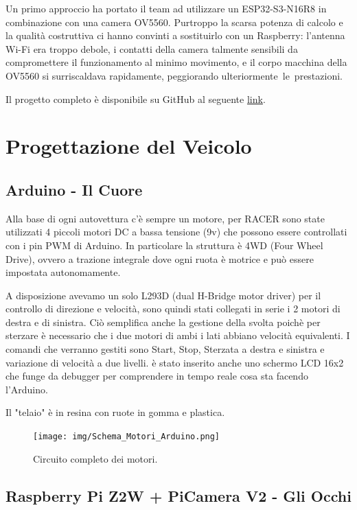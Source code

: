 \documentclass{article}
\begin{document}
    Un primo approccio ha portato il team ad utilizzare un ESP32-S3-N16R8 in combinazione con una camera OV5560. Purtroppo la scarsa potenza di calcolo e la qualità costruttiva ci hanno convinti a sostituirlo con un Raspberry: l’antenna Wi-Fi era troppo debole, i contatti della camera talmente sensibili da compromettere il funzionamento al minimo movimento, e il corpo macchina della OV5560 si surriscaldava rapidamente, peggiorando ulteriormente le prestazioni.

    Il progetto completo è disponibile su GitHub al seguente \href{https://github.com/Valerio-Cola/RACER}{link}.

\section{Progettazione del Veicolo}

\subsection{Arduino - Il Cuore}

Alla base di ogni autovettura c'è sempre un motore, per RACER sono state utilizzati 4 piccoli motori DC a bassa tensione (9v) che possono essere controllati con i pin PWM di Arduino. In particolare la struttura è 4WD (Four Wheel Drive), ovvero a trazione integrale dove ogni ruota è motrice e può essere impostata autonomamente.

A disposizione avevamo un solo L293D (dual H-Bridge motor driver) per il controllo di direzione e velocità, sono quindi stati collegati in serie i 2 motori di destra e di sinistra. Ciò semplifica anche la gestione della svolta poichè per sterzare è necessario che i due motori di ambi i lati abbiano velocità equivalenti. I comandi che verranno gestiti sono Start, Stop, Sterzata a destra e sinistra e variazione di velocità a due livelli.
è stato inserito anche uno schermo LCD 16x2 che funge da debugger per comprendere in tempo reale cosa sta facendo l'Arduino.

Il "telaio" è in resina con ruote in gomma e plastica.



\begin{figure}[h!]
\centering
\texttt{[image: img/Schema\_Motori\_Arduino.png]}
\caption{Circuito completo dei motori.}
\end{figure}


\subsection{Raspberry Pi Z2W + PiCamera V2 - Gli Occhi}
\end{document}
